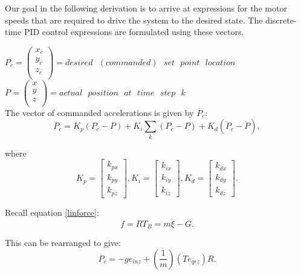Our goal in the following derivation is to arrive at expressions for the motor speeds that are required to drive the system to the desired state. The discrete-time PID control expressions are formulated using these vectors.

$P_c = \left( \begin{array}{c}
x_c\\y_c\\z_c\\
\end{array}\right) = desired\text{ } (commanded)\text{ }set\text{ }point\text{ }location $\\

$P = \left( \begin{array}{c}
x\\y\\z\\
\end{array}\right) = actual \text{ }position\text{ }at\text{ }time\text{ }step\text{ }k$\\

The vector of commanded accelerations is given by $\ddot{P_c}$:
\begin{equation}
    \label{eq:acc_comm}
    \ddot{P_c} = K_p(P_c - P) + K_i \sum_k (P_c-P) + K_d(\dot{P}_c - \dot{P}),
\end{equation}

where
\begin{equation}
 K_p = \left[ \begin{array}{c} k_{px} \\ k_{py} \\ k_{pz}  \end{array} \right] , K_i = \left[ \begin{array}{c} k_{ix} \\ k_{iy} \\ k_{iz}  \end{array} \right], K_d = \left[ \begin{array}{c} k_{dx} \\ k_{dy} \\ k_{dz}  \end{array} \right] .
\end{equation}

Recall equation \ref{linforce}:
\begin{equation}
    f =  R  T_B = m \ddot{ \xi} -  G.
\end{equation}

This can be rearranged to give:
\begin{equation}
    \label{eq:acc_from_model}
    \ddot{P_c} = - g e_{inz} + \left(\frac{1}{m}\right) \left(T e_{qrz}\right) R .
\end{equation}

